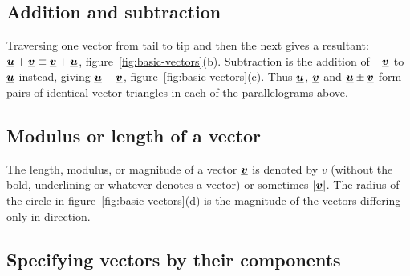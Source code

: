\subsection*{Addition and subtraction}
Traversing one vector from tail to tip and then the next gives a resultant:\nl 
$\mathit{\underline{\boldsymbol{u}}} + \mathit{\underline{\boldsymbol{v}}} \equiv \mathit{\underline{\boldsymbol{v}}} + \mathit{\underline{\boldsymbol{u}}}$, \nl
figure~\ref{fig:basic-vectors}(b). \nll 
Subtraction is the addition of $-\mathit{\underline{\boldsymbol{v}}}$ to $\mathit{\underline{\boldsymbol{u}}}$ instead, giving $\mathit{\underline{\boldsymbol{u}}} - \mathit{\underline{\boldsymbol{v}}}$, figure~\ref{fig:basic-vectors}(c).  Thus $\mathit{\underline{\boldsymbol{u}}}$, $\mathit{\underline{\boldsymbol{v}}}$ and $\mathit{\underline{\boldsymbol{u}}} \pm \mathit{\underline{\boldsymbol{v}}}$ form pairs of identical vector triangles in each of the parallelograms above.

\subsection*{Modulus or length of a vector}
The length, modulus, or magnitude of a vector $\mathit{\underline{\boldsymbol{v}}}$ is denoted by $v$ (without the bold, underlining or whatever denotes a vector) or sometimes $|\mathit{\underline{\boldsymbol{v}}}|$.  The radius of the circle in figure~\ref{fig:basic-vectors}(d) is the magnitude of the vectors differing only in direction.

\subsection*{Specifying vectors by their components}



